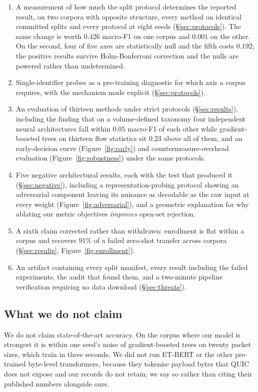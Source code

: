 \begin{enumerate}
\item A measurement of how much the split protocol determines the reported
      result, on two corpora with opposite structure, every method on identical
      committed splits and every protocol at eight seeds
      (\S\ref{sec:protocols}). The same change is worth $0.426$ macro-F1 on one
      corpus and $0.001$ on the other. On the second, four of five axes are
      statistically null and the fifth costs $0.192$; the positive results
      survive Holm-Bonferroni correction and the nulls are powered rather than
      undetermined.
\item Single-identifier probes as a pre-training diagnostic for which axis a
      corpus requires, with the mechanism made explicit
      (\S\ref{sec:protocols}).
\item An evaluation of thirteen methods under strict protocols
      (\S\ref{sec:results}), including the finding that on a volume-defined
      taxonomy four independent neural architectures fall within $0.05$ macro-F1
      of each other while gradient-boosted trees on thirteen flow statistics sit
      $0.23$ above all of them, and an early-decision curve
      (Figure~\ref{fig:early}) and countermeasure-overhead evaluation
      (Figure~\ref{fig:robustness}) under the same protocols.
\item Five negative architectural results, each with the test that produced it
      (\S\ref{sec:negative}), including a representation-probing protocol
      showing an adversarial component leaving its nuisance as decodable as the
      raw input at every weight (Figure~\ref{fig:adversarial}), and a geometric
      explanation for why ablating our metric objectives \emph{improves}
      open-set rejection.
\item A sixth claim corrected rather than withdrawn: enrollment is flat within
      a corpus and recovers 91\% of a failed zero-shot transfer across corpora
      (\S\ref{sec:results}, Figure~\ref{fig:enrollment}).
\item An artifact containing every split manifest, every result including the
      failed experiments, the audit that found them, and a two-minute pipeline
      verification requiring no data download (\S\ref{sec:threats}).
\end{enumerate}

\subsection*{What we do not claim}

We do not claim state-of-the-art accuracy. On the corpus where our model is
strongest it is within one seed's noise of gradient-boosted trees on twenty
packet sizes, which train in three seconds. We did not run ET-BERT or the other
pre-trained byte-level transformers, because they tokenise payload bytes that
QUIC does not expose and our records do not retain; we say so rather than
citing their published numbers alongside ours.
